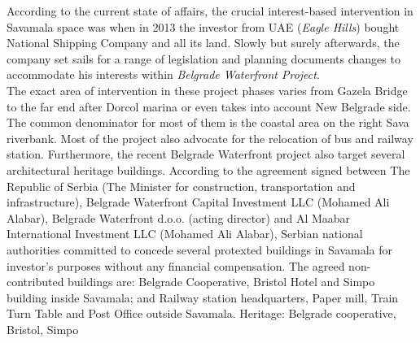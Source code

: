 \documentclass[11pt]{report}
\begin{document}
\begin{itemize}
According to the current state of affairs, the crucial interest-based intervention in Savamala space was when in 2013 the investor from UAE (\textit{Eagle Hills}) bought National Shipping Company and all its land. Slowly but surely afterwards, the company set sails for a range of legislation and planning documents changes to accommodate his interests within \textit{Belgrade Waterfront Project}.
\\
The exact area of intervention in these project phases varies from Gazela Bridge to the far end after Dorcol marina or even takes into account New Belgrade side. The common denominator for most of them is the coastal area on the right Sava riverbank. Most of the project also advocate for the relocation of bus and railway station.\footnotemark
Furthermore, the recent Belgrade Waterfront project also target several architectural heritage buildings. According to the agreement signed between
The Republic of Serbia (The Minister for construction, transportation and infrastructure), 
Belgrade Waterfront Capital Investment LLC (Mohamed Ali Alabar),
Belgrade Waterfront d.o.o. (acting director) and
Al Maabar International Investment LLC (Mohamed Ali Alabar),
Serbian national authorities committed to concede several protexted buildings in Savamala for investor's purposes without any financial compensation. 
The agreed non-contributed buildings are: Belgrade Cooperative, Bristol Hotel and Simpo building inside Savamala; and Railway station headquarters, Paper mill, Train Turn Table and Post Office outside Savamala.
Heritage: Belgrade cooperative, Bristol, Simpo


\end{itemize}
\end{document}
